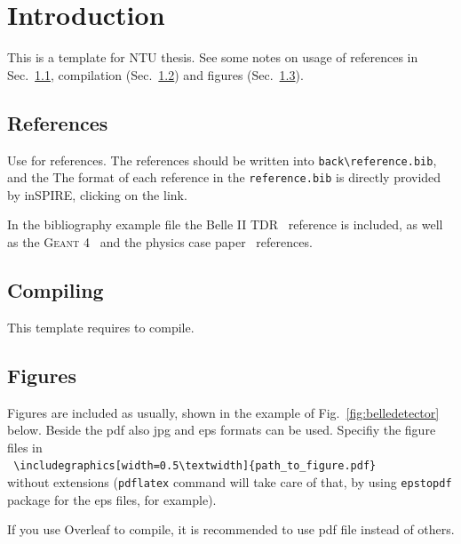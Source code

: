 
\chapter[Introduction to be shown in ToC] %
        {Introduction}
\label{chp:Introduction}

This is a template for NTU thesis. See some notes on usage of 
references in Sec.~\ref{sec:ref}, compilation (Sec.~\ref{sec:com}) and figures (Sec.~\ref{sec:fig}). 

\section{References}
\label{sec:ref}

Use  for references. The references should be written into {\tt back\textbackslash reference.bib}, and the 
The format of each reference in the {\tt reference.bib} is directly provided by inSPIRE, clicking on the  link. 

In the bibliography example file the Belle II TDR~\cite{Abe:2010sj} reference is included, as well as 
the \textsc{Geant 4}~\cite{Agostinelli:2002hh} and the physics case paper~\cite{Aushev:2010bq} references.

\section{Compiling}
\label{sec:com}

This template requires  to compile.

\section{Figures}
\label{sec:fig}

Figures are included as usually, shown in the example of Fig.~\ref{fig:belledetector} below. Beside the pdf also jpg and eps 
formats can be used. Specifiy the figure files in \\
{\tt
\textbackslash includegraphics[width=0.5\textbackslash textwidth]\{path\_to\_figure.pdf\}\\
}
without extensions ({\tt pdflatex} command will take care of that, by using {\tt epstopdf} package 
for the eps files, for example). 

If you use Overleaf to compile, it is recommended to use pdf file instead of others.

